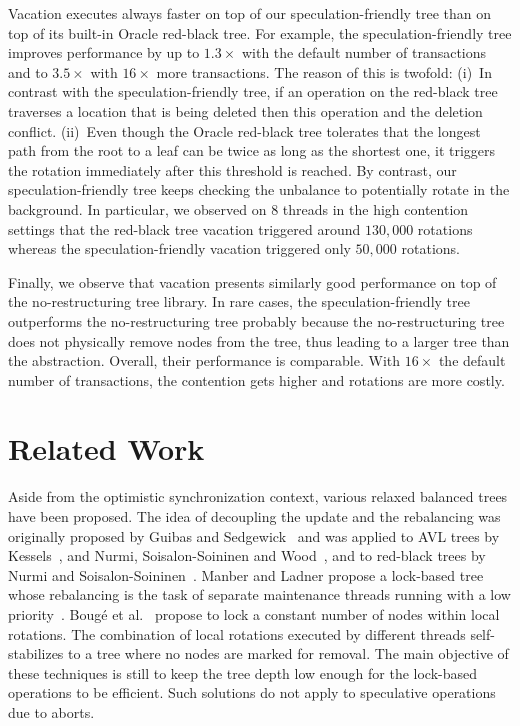Vacation executes always faster on top of our speculation-friendly tree than on top of its built-in Oracle red-black tree. 
For example, the speculation-friendly tree improves performance by up to $1.3\times$ with the default 
number of transactions and to $3.5\times$ with $16\times$ more transactions.
%
The reason of this is twofold: 
(i)~In contrast with the speculation-friendly tree, if an operation on the red-black tree traverses a location that is being 
deleted then this operation and the deletion conflict. (ii)~Even though the Oracle red-black tree tolerates that the longest 
path from the root to a leaf can be twice as long as the shortest one, it triggers the rotation immediately after this threshold
is reached. By contrast, our speculation-friendly tree keeps checking the unbalance to potentially rotate in the background.
In particular, 
we observed on 8 threads in the high contention settings that the red-black tree vacation triggered around 
$130,000$ rotations whereas the speculation-friendly vacation triggered only $50,000$ rotations.

Finally, we observe that vacation presents similarly good performance on top of the no-restructuring tree library.
In rare cases, the speculation-friendly tree outperforms the no-restructuring tree probably because the no-restructuring tree
does not physically remove nodes from the tree,  thus leading to a larger tree than the abstraction.
Overall, their performance is comparable. With $16\times$ the default number of transactions,
the contention gets higher and rotations are more costly.

\section{Related Work}\label{sec:rw}

Aside from the optimistic synchronization context, various relaxed balanced trees have been proposed.
The idea of decoupling the update and the rebalancing was originally 
proposed by Guibas and Sedgewick~\cite{GS78} and was applied to AVL trees by Kessels~\cite{Kes83}, and 
Nurmi, Soisalon-Soininen and Wood~\cite{NSW87},
and to red-black trees by Nurmi and Soisalon-Soininen~\cite{NS98}.
Manber and Ladner propose a lock-based tree whose rebalancing is the task of separate maintenance threads running with a 
low priority~\cite{UR84}.  
Boug\'e et al.~\cite{IRISAppr} propose to lock a constant number of nodes within local rotations. 
The combination of local rotations executed by different threads self-stabilizes to a tree where no nodes are marked for removal.
The main objective of these techniques is still to keep the tree depth low enough for the lock-based operations to be efficient.
Such solutions do not apply to speculative operations due to aborts.
 
